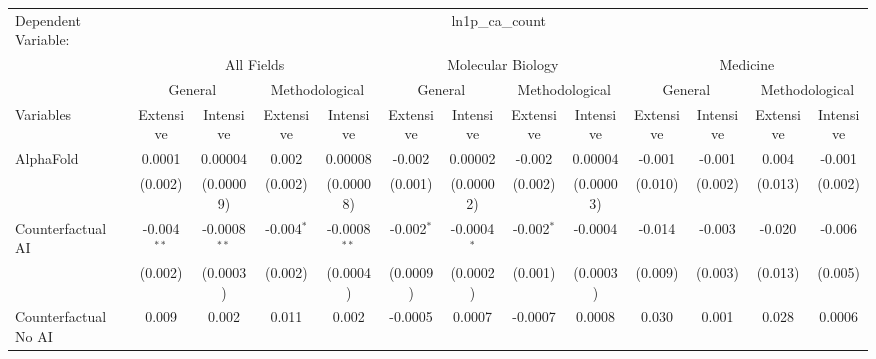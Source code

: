 \begingroup
\centering
\begin{tabular}{lcccccccccccc}
   \tabularnewline \midrule \midrule
   Dependent Variable: & \multicolumn{12}{c}{ln1p\_ca\_count}\\
 & \multicolumn{4}{c}{All Fields} & \multicolumn{4}{c}{Molecular Biology} & \multicolumn{4}{c}{Medicine} \\
\cmidrule(lr){2-5} \cmidrule(lr){6-9} \cmidrule(lr){10-13}
 & \multicolumn{2}{c}{General} & \multicolumn{2}{c}{Methodological} & \multicolumn{2}{c}{General} & \multicolumn{2}{c}{Methodological} & \multicolumn{2}{c}{General} & \multicolumn{2}{c}{Methodological} \\
\cmidrule(lr){2-3} \cmidrule(lr){4-5} \cmidrule(lr){6-7} \cmidrule(lr){8-9} \cmidrule(lr){10-11} \cmidrule(lr){12-13}
Variables & \multicolumn{1}{c}{Extensive} & \multicolumn{1}{c}{Intensive} & \multicolumn{1}{c}{Extensive} & \multicolumn{1}{c}{Intensive} & \multicolumn{1}{c}{Extensive} & \multicolumn{1}{c}{Intensive} & \multicolumn{1}{c}{Extensive} & \multicolumn{1}{c}{Intensive} & \multicolumn{1}{c}{Extensive} & \multicolumn{1}{c}{Intensive} & \multicolumn{1}{c}{Extensive} & \multicolumn{1}{c}{Intensive} \\
\cmidrule(lr){1-1}\cmidrule(lr){2-2} \cmidrule(lr){3-3} \cmidrule(lr){4-4} \cmidrule(lr){5-5} \cmidrule(lr){6-6} \cmidrule(lr){7-7} \cmidrule(lr){8-8} \cmidrule(lr){9-9} \cmidrule(lr){10-10} \cmidrule(lr){11-11} \cmidrule(lr){12-12} \cmidrule(lr){13-13}
   AlphaFold                                & 0.0001        & 0.00004        & 0.002        & 0.00008        & -0.002       & 0.00002       & -0.002       & 0.00004       & -0.001  & -0.001   & 0.004   & -0.001\\   
                                            & (0.002)       & (0.00009)      & (0.002)      & (0.00008)      & (0.001)      & (0.00002)     & (0.002)      & (0.00003)     & (0.010) & (0.002)  & (0.013) & (0.002)\\   
   Counterfactual AI                        & -0.004$^{**}$ & -0.0008$^{**}$ & -0.004$^{*}$ & -0.0008$^{**}$ & -0.002$^{*}$ & -0.0004$^{*}$ & -0.002$^{*}$ & -0.0004       & -0.014  & -0.003   & -0.020  & -0.006\\   
                                            & (0.002)       & (0.0003)       & (0.002)      & (0.0004)       & (0.0009)     & (0.0002)      & (0.001)      & (0.0003)      & (0.009) & (0.003)  & (0.013) & (0.005)\\   
   Counterfactual No AI                     & 0.009         & 0.002          & 0.011        & 0.002          & -0.0005      & 0.0007        & -0.0007      & 0.0008        & 0.030   & 0.001    & 0.028   & 0.0006\\   

\end{tabular}
